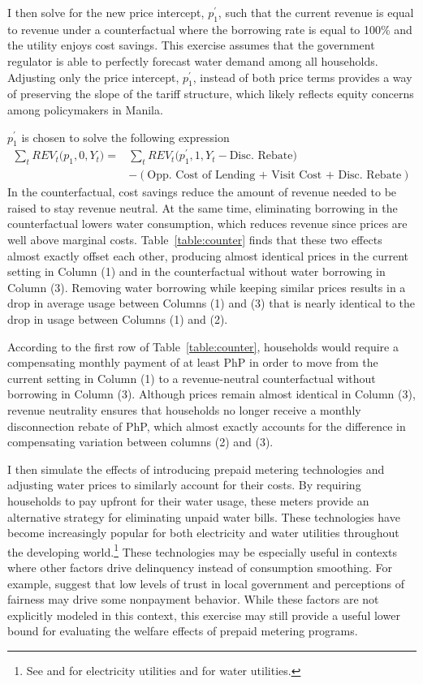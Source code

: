 \documentclass[12pt]{article}
\begin{document}
I then solve for the new price intercept, $p^{\prime}_1$, such that the current revenue is equal to revenue under a counterfactual where the borrowing rate is equal to 100\% and the utility enjoys cost savings.   This exercise assumes that the government regulator is able to perfectly forecast water demand among all households.  Adjusting only the price intercept, $p^{\prime}_1$, instead of both price terms provides a way of preserving the slope of the tariff structure, which likely reflects equity concerns among policymakers in Manila.  

$p^{\prime}_1$ is chosen to solve the following expression
\begin{align*}
\sum_t REV_t \big(p_1,0,Y_t \big) =& \sum_t REV_t \big(p^{\prime}_1,1, Y_t - \text{Disc. Rebate} \big) \\
& - (\text{Opp. Cost of Lending + Visit Cost + Disc. Rebate})
\end{align*}
In the counterfactual, cost savings reduce the amount of revenue needed to be raised to stay revenue neutral.  At the same time, eliminating borrowing in the counterfactual lowers water consumption, which reduces revenue since prices are well above marginal costs.  Table~\ref{table:counter} finds that these two effects almost exactly offset each other, producing almost identical prices in the current setting in Column (1) and in the counterfactual without water borrowing in Column (3).  Removing water borrowing while keeping similar prices results in a drop in average usage between Columns (1) and (3) that is nearly identical to the drop in usage between Columns (1) and (2).

According to the first row of Table~\ref{table:counter}, households would require a compensating monthly payment of at least PhP in order to move from the current setting in  Column (1) to a revenue-neutral counterfactual without borrowing in Column (3).  Although prices remain almost identical in Column (3), revenue neutrality ensures that households no longer receive a monthly disconnection rebate of PhP, which almost exactly accounts for the difference in compensating variation between columns (2) and (3).  


I then simulate the effects of introducing prepaid metering technologies and adjusting water prices to similarly account for their costs.  By requiring households to pay upfront for their water usage, these meters provide an alternative strategy for eliminating unpaid water bills.  These technologies have become increasingly popular for both electricity and water utilities throughout the developing world.\footnote{See \cite{jack2016charging} and \cite{northeast2014} for electricity utilities and \cite{heymans2014limits} for water utilities.}  These technologies may be especially useful in contexts where other factors drive delinquency instead of consumption smoothing.   For example, \cite{szabo2015reducing} suggest that low levels of trust in local government and perceptions of fairness may drive some nonpayment behavior.  While these factors are not explicitly modeled in this context, this exercise may still provide a useful lower bound for evaluating the welfare effects of prepaid metering programs.
\end{document}
